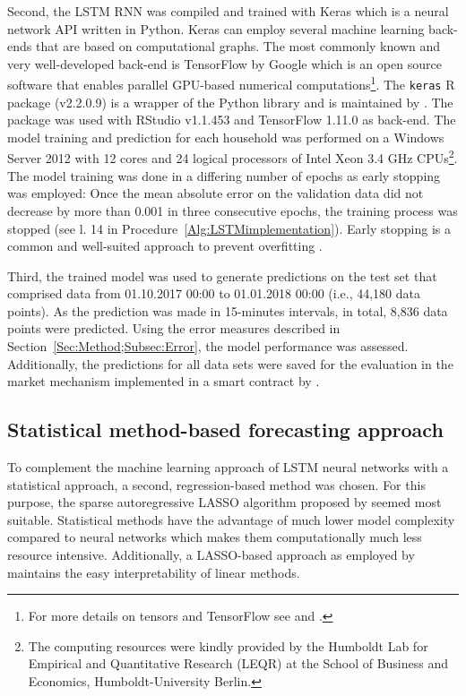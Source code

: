 Second, the LSTM RNN was compiled and trained with Keras which is a neural network API written in Python. Keras can employ several machine learning back-ends that are based on computational graphs. The most commonly known and very well-developed back-end is TensorFlow by Google which is an open source software that enables parallel GPU-based numerical computations\footnote{For more details on tensors and TensorFlow see \citet{Abadi:2017} and \citet{Goldsborough:2016}.}. The \texttt{keras} R package (v2.2.0.9) is a wrapper of the Python library and is maintained by \citet{chollet:2017kerasR}. The package was used with RStudio v1.1.453 and TensorFlow 1.11.0 as back-end. The model training and prediction for each household was performed on a Windows Server 2012 with 12 cores and 24 logical processors of Intel Xeon 3.4 GHz CPUs\footnote{The computing resources were kindly provided by the Humboldt Lab for Empirical and Quantitative Research (LEQR) at the School of Business and Economics, Humboldt-University Berlin.}. The model training was done in a differing number of epochs as early stopping was employed: Once the mean absolute error on the validation data did not decrease by more than 0.001 in three consecutive epochs, the training process was stopped (see l. 14 in Procedure~\ref{Alg:LSTMimplementation}). Early stopping is a common and well-suited approach to prevent overfitting \citep{Chollet:2018}.

Third, the trained model was used to generate predictions on the test set that comprised data from 01.10.2017 00:00 to 01.01.2018 00:00 (i.e., 44,180 data points). As the prediction was made in 15-minutes intervals, in total, 8,836 data points were predicted. Using the error measures described in Section~\ref{Sec:Method;Subsec:Error}, the model performance was assessed. Additionally, the predictions for all data sets were saved for the evaluation in the market mechanism implemented in a smart contract by \citet{Mengelkamp:2018a}.


\subsection{Statistical method-based forecasting approach} \label{Sec:Method;Subsec:LASSO}

To complement the machine learning approach of LSTM neural networks with a statistical approach, a second, regression-based method was chosen. For this purpose, the sparse autoregressive LASSO algorithm proposed by \citet{Li:2017} seemed most suitable. Statistical methods have the advantage of much lower model complexity compared to neural networks which makes them computationally much less resource intensive. Additionally, a LASSO-based approach as employed by \citet{Li:2017} maintains the easy interpretability of linear methods.



